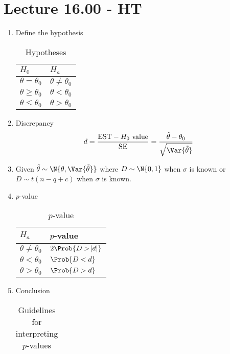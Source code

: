 \section{Lecture 16.00 - HT}
\begin{enumerate}[(1)]
    \item Define the hypothesis
          \begin{table}[!htbp]
              \centering
              \caption{Hypotheses}
              \begin{tabularx}{0.5\linewidth}{@{}YY@{}}
                  $ H_0 $                & $ H_a $                \\
                  \midrule
                  $ \theta=\theta_0 $    & $ \theta\ne \theta_0 $ \\
                  $ \theta\ge \theta_0 $ & $ \theta<\theta_0 $    \\
                  $ \theta\le \theta_0 $ & $ \theta>\theta_0 $
              \end{tabularx}
          \end{table}
    \item Discrepancy
          \[ d=\frac{\text{EST}-\text{$H_0$ value}}{\text{SE}}=\frac{\hat{\theta}-\theta_0}{\sqrt{\Var{\tilde{\theta}}}}   \]
    \item Given $ \tilde{\theta} \sim \N{\theta,\Var{\tilde{\theta}}} $
          where $ D \sim \N{0,1} $ when $ \sigma $ is known or
          $ D \sim t(n-q+c) $ when $ \sigma $ is known.
    \item $ p $-value
          \begin{table}[!htbp]
              \centering
              \caption{$ p $-value}
              \begin{tabularx}{0.5\linewidth}{@{}YY@{}}
                  $ H_a $                & $ p $-value           \\
                  \midrule
                  $ \theta\ne \theta_0 $ & $ 2\Prob{D>\abs{d}} $ \\
                  $ \theta<\theta_0 $    & $ \Prob{D<d} $        \\
                  $ \theta>\theta_0 $    & $ \Prob{D>d} $
              \end{tabularx}
          \end{table}
    \item Conclusion
          \begin{table}[!htbp]
              \centering
              \caption{Guidelines for interpreting $ p $-values}
              \begin{tabularx}{0.7\linewidth}{@{}YY@{}}

\end{tabularx}
\end{table}
\end{enumerate}
